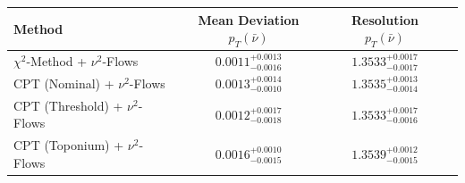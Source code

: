     \begin{tabular}{lccc}
        \toprule
        Method & Mean Deviation $p_{T}(\bar{\nu})$ & Resolution $p_{T}(\bar{\nu})$ \\
        \midrule
        $\chi^2$-Method + $\nu^2$-Flows & $0.0011^{+0.0013}_{-0.0016}$ & $1.3533^{+0.0017}_{-0.0017}$ \\
        CPT (Nominal) + $\nu^2$-Flows & $0.0013^{+0.0014}_{-0.0010}$ & $1.3535^{+0.0013}_{-0.0014}$ \\
        CPT (Threshold) + $\nu^2$-Flows & $0.0012^{+0.0017}_{-0.0018}$ & $1.3533^{+0.0017}_{-0.0016}$ \\
        CPT (Toponium) + $\nu^2$-Flows & $0.0016^{+0.0010}_{-0.0015}$ & $1.3539^{+0.0012}_{-0.0015}$ \\
        \bottomrule
    \end{tabular}